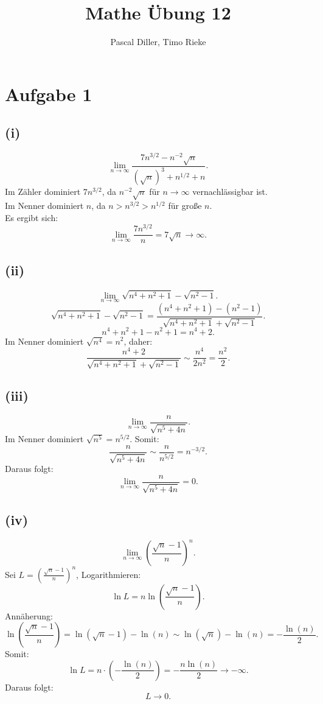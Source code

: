\documentclass{article}
\title{Mathe Übung 12}
\author{Pascal Diller, Timo Rieke}
\begin{document}
\maketitle

\section*{Aufgabe 1}

\subsection*{(i)}
\[\lim_{n \to \infty} \frac{7n^{3/2} - n^{-2} \sqrt{n}}{(\sqrt{n})^3 + n^{1/2} + n}.\]
Im Zähler dominiert \(7n^{3/2}\), da \(n^{-2} \sqrt{n}\) für \(n \to \infty\) vernachlässigbar ist. \\
Im Nenner dominiert \(n\), da \(n > n^{3/2} > n^{1/2}\) für große \(n\). \\
Es ergibt sich:
\[\lim_{n \to \infty} \frac{7n^{3/2}}{n} = 7\sqrt{n} \to \infty.\]

\subsection*{(ii)}
\[\lim_{n \to \infty} \sqrt{n^4 + n^2 + 1} - \sqrt{n^2 - 1}.\]
\[\sqrt{n^4 + n^2 + 1} - \sqrt{n^2 - 1} = \frac{(n^4 + n^2 + 1) - (n^2 - 1)}{\sqrt{n^4 + n^2 + 1} + \sqrt{n^2 - 1}}.\]
\[n^4 + n^2 + 1 - n^2 + 1 = n^4 + 2.\]
Im Nenner dominiert \(\sqrt{n^4} = n^2\), daher:
\[\frac{n^4 + 2}{\sqrt{n^4 + n^2 + 1} + \sqrt{n^2 - 1}} \sim \frac{n^4}{2n^2} =\frac{n^2}{2}.\]

\subsection*{(iii)} 
\[\lim_{n \to \infty} \frac{n}{\sqrt{n^5 + 4n}}.\]
Im Nenner dominiert \(\sqrt{n^5} = n^{5/2}\). Somit:
\[\frac{n}{\sqrt{n^5 + 4n}} \sim \frac{n}{n^{5/2}} = n^{-3/2}.\]
Daraus folgt:
\[\lim_{n \to \infty} \frac{n}{\sqrt{n^5 + 4n}} = 0.\]

\subsection*{(iv)} 
\[\lim_{n \to \infty} \left(\frac{\sqrt{n} - 1}{n}\right)^n.\]
Sei \(L = \left(\frac{\sqrt{n} - 1}{n}\right)^n\), Logarithmieren:
\[\ln L = n \ln\left(\frac{\sqrt{n} - 1}{n}\right).\]
Annäherung:
\[\ln\left(\frac{\sqrt{n} - 1}{n}\right) = \ln(\sqrt{n} - 1) - \ln(n) \sim \ln(\sqrt{n}) - \ln(n) = -\frac{\ln(n)}{2}.\]
Somit:
\[\ln L = n \cdot \left(-\frac{\ln(n)}{2}\right) = -\frac{n \ln(n)}{2} \to -\infty.\]
Daraus folgt:
\[L \to 0.\]
\end{document}
